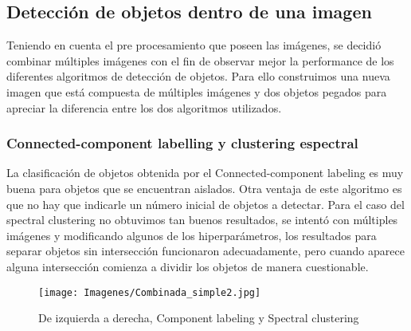 \documentclass{article}
\begin{document}
\subsection{Detección de objetos dentro de una imagen}
Teniendo en cuenta el pre procesamiento que poseen las imágenes, se decidió combinar múltiples imágenes con el fin de observar mejor la performance de los diferentes algoritmos de detección de objetos. Para ello construimos una nueva imagen que está compuesta de múltiples imágenes y dos objetos pegados para apreciar la diferencia entre los dos algoritmos utilizados.



\subsubsection{Connected-component labelling y clustering espectral}

La clasificación de objetos obtenida por el Connected-component labeling es muy buena para objetos que se encuentran aislados. Otra ventaja de este algoritmo es que no hay que indicarle un número inicial de objetos a detectar. Para el caso del spectral clustering no obtuvimos tan buenos resultados, se intentó con múltiples imágenes y modificando algunos de los hiperparámetros, los resultados para separar objetos sin intersección funcionaron adecuadamente, pero cuando aparece alguna intersección comienza a dividir los objetos de manera cuestionable.

\clearpage
\begin{figure}[!htb]
    \centering
    \texttt{[image: Imagenes/Combinada\_simple2.jpg]}
    \caption{De izquierda a derecha, Component labeling y Spectral clustering}
    \label{fig:objetos}
\end{figure}
\end{document}
